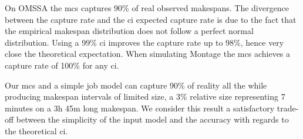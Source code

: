 \documentclass[10pt,conference,compsocconf]{IEEEtran}
\begin{document}
On OMSSA the  \ac{mcs} captures 90\% of real observed  makespans. The divergence
between the  capture rate and  the \ac{ci} expected capture  rate is due  to the
fact that the  empirical makespan distribution does not follow  a perfect normal
distribution. Using  a 99\% \ac{ci}  improves the capture  rate up to  98\%,
hence very close  the theoretical expectation.   When simulating Montage  the
\ac{mcs} achieves a capture rate of 100\% for any \ac{ci}.

Our \ac{mcs} and a simple job model can capture 90\% of reality all the while
producing makespan intervals of limited size, a 3\% relative size representing 7
minutes on a 3h 45m long makespan. We consider this result a satisfactory
trade-off between the simplicity of the input model and the accuracy with
regards to the theoretical \ac{ci}.

\end{document}
